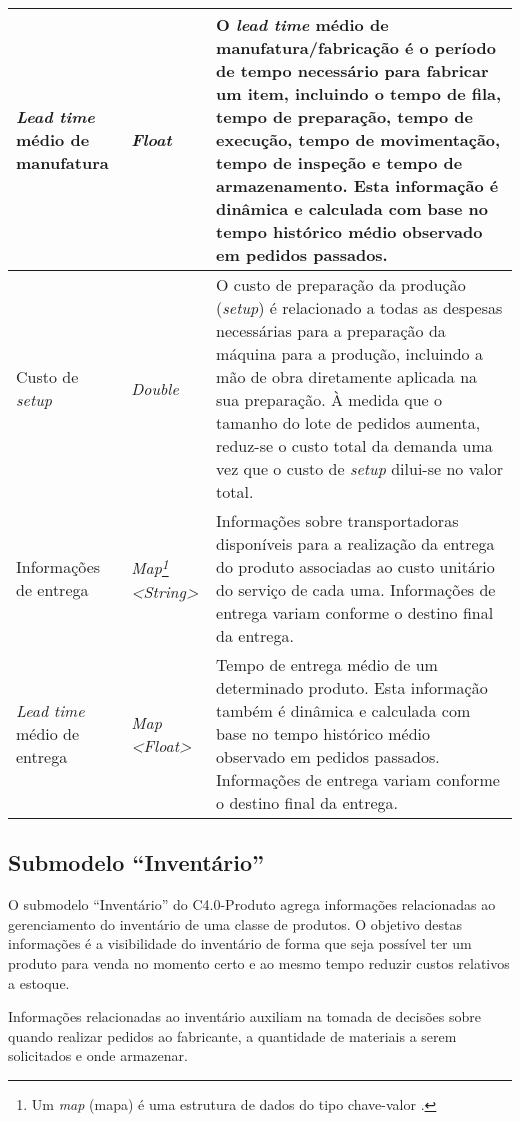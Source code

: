 \begin{longtable}{|p{}|p{}|p{}|}
	\\ \hline \textit{Lead time} médio de manufatura & \textit{Float} & O \textit{lead time} médio de manufatura/fabricação é o período de tempo necessário para fabricar um item, incluindo o tempo de fila, tempo de preparação, tempo de execução, tempo de movimentação, tempo de inspeção e tempo de armazenamento. Esta informação é dinâmica e calculada com base no tempo histórico médio observado em pedidos passados.

	\\ \hline Custo de \textit{setup} & \textit{Double} & O custo de preparação da produção (\textit{setup}) é relacionado a todas as despesas necessárias para a preparação da máquina para a produção, incluindo a mão de obra diretamente aplicada na sua preparação. À medida que o tamanho do lote de pedidos aumenta, reduz-se o custo total da demanda uma vez que o custo de \textit{setup} dilui-se no valor total.

	\\ \hline Informações de entrega & \textit{Map\footnote{Um \textit{map} (mapa) é uma estrutura de dados do tipo chave-valor \cite{map2022mdn}.}  <String>} & Informações sobre transportadoras disponíveis para a realização da entrega do produto associadas ao custo unitário do serviço de cada uma. Informações de entrega variam conforme o destino final da entrega.

	\\ \hline \textit{Lead time} médio de entrega & \textit{Map <Float>} & Tempo de entrega médio de um determinado produto. Esta informação também é dinâmica e calculada com base no tempo histórico médio observado em pedidos passados. Informações de entrega variam conforme o destino final da entrega.

	\\ \hline
\end{longtable}

\subsection{Submodelo ``Inventário''}

O submodelo ``Inventário'' do C4.0-Produto agrega informações relacionadas ao gerenciamento do inventário de uma classe de produtos. O objetivo destas informações é a visibilidade do inventário de forma que seja possível ter um produto para venda no momento certo e ao mesmo tempo reduzir custos relativos a estoque.

Informações relacionadas ao inventário auxiliam na tomada de decisões sobre quando realizar pedidos ao fabricante, a quantidade de materiais a serem solicitados e onde armazenar.

